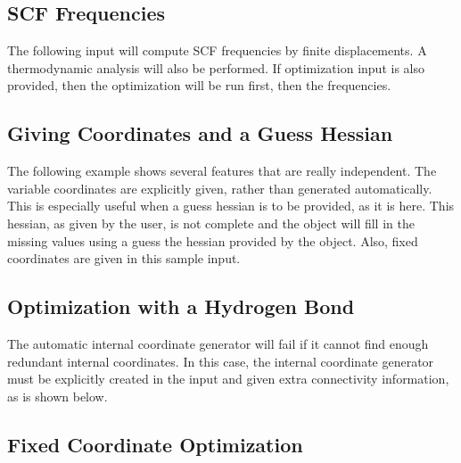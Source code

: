 

\subsection{SCF Frequencies}

The following input will compute SCF frequencies by finite
displacements.  A thermodynamic analysis will also be
performed.  If optimization input is also provided, then the
optimization will be run first, then the frequencies.



\subsection{Giving Coordinates and a Guess Hessian}

The following example shows several features that are really independent.
The variable coordinates are explicitly given, rather than generated
automatically.  This is especially useful when a guess hessian is to be
provided, as it is here.  This hessian, as given by the user, is not
complete and the  object will fill in the missing
values using a guess the hessian provided by the 
object.  Also, fixed coordinates are given in this sample input.



\subsection{Optimization with a Hydrogen Bond}

The automatic internal coordinate generator will fail if it cannot find
enough redundant internal coordinates.  In this case, the internal
coordinate generator must be explicitly created in the input and given
extra connectivity information, as is shown below.



\subsection{Fixed Coordinate Optimization}
\label{fixedexample}

